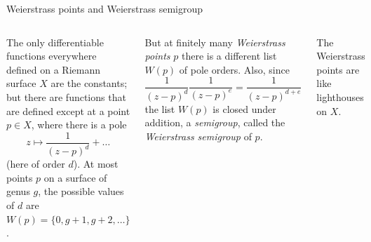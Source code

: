 \documentclass[12pt, aspectratio=169]{beamer}
\begin{document}
\begin{frame}{Weierstrass points and Weierstrass semigroup}
\begin{columns}
 The only differentiable functions
 everywhere defined on a Riemann surface $X$ are the constants;
 but there are functions that are defined except
 at a point $p\in X$, where there is a pole 
 $$
 z\mapsto \frac{1}{(z-p)^d} + \dots
 $$
 (here of order $d$). At most points $p$ on a surface of
 genus $g$, the possible values of $d$ are
$W(p) = \{0, g+1,g+2,\dots\}$.

But at finitely many \emph{Weierstrass points} $p$
there is a different list $W(p)$ of pole orders. Also, since
$$
\frac{1}{(z-p)^d}\frac{1}{(z-p)^e} = \frac{1}{(z-p)^{d+e}}
$$
the list $W(p)$ is closed under addition, a \emph{semigroup},
called the \emph{Weierstrass semigroup} of $p$.

\bigskip

The Weierstrass points are like lighthouses on $X$.
\end{columns}
 
\end{frame}
\end{document}
